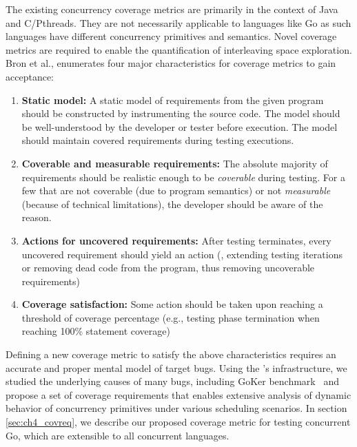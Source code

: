 The existing concurrency coverage metrics are primarily in the context of Java and C/Pthreads.
%
They are not necessarily applicable to languages like Go as such languages have different concurrency primitives and semantics.
%
Novel coverage metrics are required to enable the quantification of interleaving space exploration.
%
Bron et al.,\cite{bron-appSyncCov-ppopp05} enumerates four major characteristics for coverage metrics to gain acceptance:
\begin{enumerate}
  \item \textbf{Static model:} A static model of requirements from the given program should be constructed by instrumenting the source code. The model should be well-understood by the developer or tester before execution. The model should maintain covered requirements during testing executions.
  \item \textbf{Coverable and measurable requirements:} The absolute majority of requirements should be realistic enough to be \textit{coverable} during testing. For a few that are not coverable (due to program semantics) or not \textit{measurable} (because of technical limitations), the developer should be aware of the reason.
  \item \textbf{Actions for uncovered requirements:} After testing terminates, every uncovered requirement should yield an action (\eg, extending testing iterations or removing dead code from the program, thus removing uncoverable requirements)
  \item \textbf{Coverage satisfaction:} Some action should be taken upon reaching a threshold of coverage percentage (e.g., testing phase termination when reaching 100\% statement coverage)
\end{enumerate}

Defining a new coverage metric to satisfy the above characteristics requires an accurate and proper mental model of target bugs.
%
Using the \goat's infrastructure, we studied the underlying causes of many bugs, including GoKer benchmark~\cite{yuan-gobench-cgo21} and propose a set of coverage requirements that enables extensive analysis of dynamic behavior of concurrency primitives under various scheduling scenarios.
%
In section \ref{sec:ch4_covreq}, we describe our proposed coverage metric for testing concurrent Go, which are extensible to all concurrent languages.
